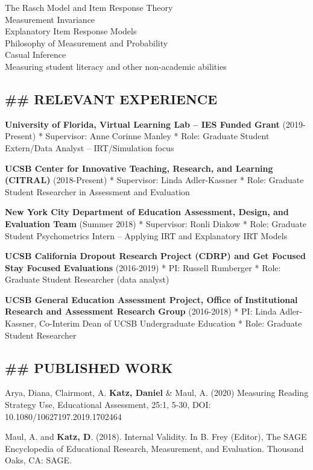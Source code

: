 \documentclass[]{article}
\begin{document}
The Rasch Model and Item Response Theory\\
Measurement Invariance\\
Explanatory Item Response Models\\
Philosophy of Measurement and Probability\\
Casual Inference\\
Measuring student literacy and other non-academic abilities

\hypertarget{relevant-experience}{%
\subsection{\#\# RELEVANT EXPERIENCE}\label{relevant-experience}}

\textbf{University of Florida, Virtual Learning Lab -- IES Funded Grant}
(2019-Present) * Supervisor: Anne Corinne Manley * Role: Graduate
Student Extern/Data Analyst -- IRT/Simulation focus

\textbf{UCSB Center for Innovative Teaching, Research, and Learning
(CITRAL)} (2018-Present) * Supervisor: Linda Adler-Kassner * Role:
Graduate Student Researcher in Assessment and Evaluation

\textbf{New York City Department of Education Assessment, Design, and
Evaluation Team} (Summer 2018) * Supervisor: Ronli Diakow * Role:
Graduate Student Psychometrics Intern -- Applying IRT and Explanatory
IRT Models

\textbf{UCSB California Dropout Research Project (CDRP) and Get Focused
Stay Focused Evaluations} (2016-2019) * PI: Russell Rumberger * Role:
Graduate Student Researcher (data analyst)

\textbf{UCSB General Education Assessment Project, Office of
Institutional Research and Assessment Research Group} (2016-2018) * PI:
Linda Adler-Kassner, Co-Interim Dean of UCSB Undergraduate Education *
Role: Graduate Student Researcher

\hypertarget{published-work}{%
\subsection{\#\# PUBLISHED WORK}\label{published-work}}

Arya, Diana, Clairmont, A. \textbf{Katz, Daniel} \& Maul, A. (2020)
Measuring Reading Strategy Use, Educational Assessment, 25:1, 5-30, DOI:
10.1080/10627197.2019.1702464

Maul, A. and \textbf{Katz, D}. (2018). Internal Validity. In B. Frey
(Editor), The SAGE Encyclopedia of Educational Research, Measurement,
and Evaluation. Thousand Oaks, CA: SAGE.
\end{document}
